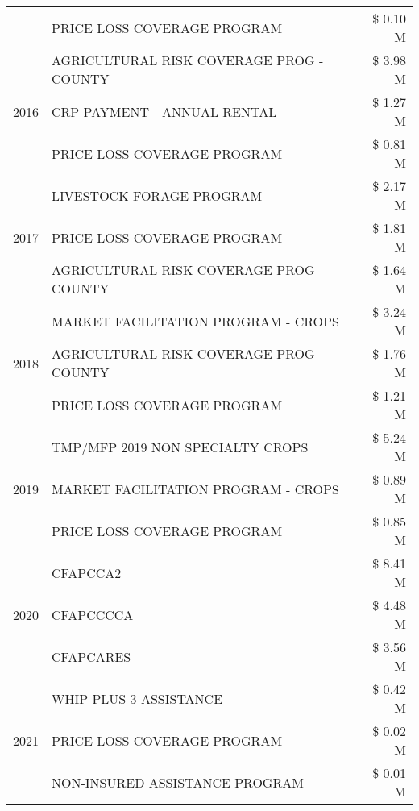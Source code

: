 \begin{tabular}{llr}
 & PRICE LOSS COVERAGE PROGRAM & \$ 0.10 M \\
\cline{1-3}
\multirow[t]{3}{*}{2016} & AGRICULTURAL RISK COVERAGE PROG - COUNTY & \$ 3.98 M \\
 & CRP PAYMENT - ANNUAL RENTAL & \$ 1.27 M \\
 & PRICE LOSS COVERAGE PROGRAM & \$ 0.81 M \\
\cline{1-3}
\multirow[t]{3}{*}{2017} & LIVESTOCK FORAGE PROGRAM & \$ 2.17 M \\
 & PRICE LOSS COVERAGE PROGRAM & \$ 1.81 M \\
 & AGRICULTURAL RISK COVERAGE PROG - COUNTY & \$ 1.64 M \\
\cline{1-3}
\multirow[t]{3}{*}{2018} & MARKET FACILITATION PROGRAM - CROPS & \$ 3.24 M \\
 & AGRICULTURAL RISK COVERAGE PROG - COUNTY & \$ 1.76 M \\
 & PRICE LOSS COVERAGE PROGRAM & \$ 1.21 M \\
\cline{1-3}
\multirow[t]{3}{*}{2019} & TMP/MFP 2019 NON SPECIALTY CROPS & \$ 5.24 M \\
 & MARKET FACILITATION PROGRAM - CROPS & \$ 0.89 M \\
 & PRICE LOSS COVERAGE PROGRAM & \$ 0.85 M \\
\cline{1-3}
\multirow[t]{3}{*}{2020} & CFAPCCA2 & \$ 8.41 M \\
 & CFAPCCCCA & \$ 4.48 M \\
 & CFAPCARES & \$ 3.56 M \\
\cline{1-3}
\multirow[t]{3}{*}{2021} & WHIP PLUS 3 ASSISTANCE & \$ 0.42 M \\
 & PRICE LOSS COVERAGE PROGRAM & \$ 0.02 M \\
 & NON-INSURED ASSISTANCE PROGRAM & \$ 0.01 M \\
\cline{1-3}
\bottomrule
\end{tabular}
